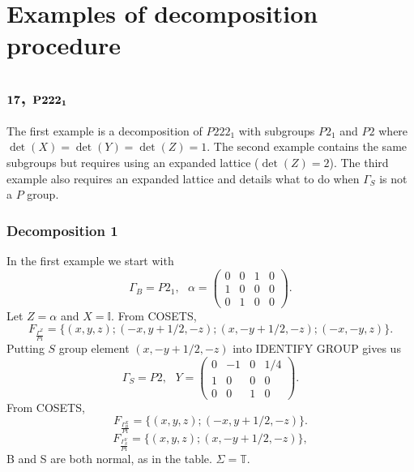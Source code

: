 \documentclass[12pt]{amsart}
\theoremstyle{definition}
\theoremstyle{remark}
\numberwithin{equation}{section}
\begin{document}
\section{\bf Examples of decomposition procedure}
\subsection{$\bf 17$, $\bf P222_{1}$} 
The first example is a decomposition of $P222_1$ with subgroups $P2_{1}$ and $P2$ where $\det(X)=\det(Y)=\det(Z)=1$. The second example contains the same subgroups but requires using an expanded lattice ($\det(Z)=2$). The third example also requires an expanded lattice and details what to do when $\Gamma_S$ is not a $P$ group.
\subsubsection{{\color{blue} Decomposition 1}}
In the first example we start with 
\[
\Gamma_B = P2_1, \ \ \  \alpha = \begin{pmatrix} 0 & 0 & 1 & 0 \\ 1 & 0 & 0 & 0 \\ 0 & 1 & 0 & 0 \end{pmatrix}.
\]
Let $Z = \alpha$ and $X=\mathbb{I}$.  From COSETS,
\[
    F_{\frac{\Gamma^Z}{P1}} = \{(x,y,z); (-x,y+1/2,-z); (x,-y+1/2,-z); (-x,-y,z)\}.
\]
Putting $S$ group element $(x,-y+1/2,-z)$ into IDENTIFY GROUP gives us 
\[
\Gamma_S = P2, \ \ \  Y = \begin{pmatrix} 0 & -1 & 0 & 1/4 \\ 1 & 0 & 0 & 0 \\ 0 & 0 & 1 & 0  \end{pmatrix}.
\]
From COSETS,
\[
    F_{\frac{\Gamma_{B}^{X}}{P1}} = \{(x,y,z); (-x,y+1/2,-z)\}.
\]
\[
    F_{\frac{\Gamma_{S}^{Y}}{P1}} = \{(x,y,z); (x,-y+1/2,-z)\},
\]
{\color{blue} B and S are both normal, as in the table.}
{\color{blue} $\Sigma = \mathbb{T}$.}
\end{document}

